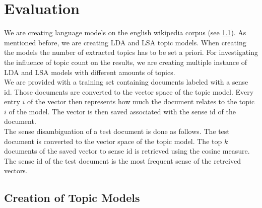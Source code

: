 \section{Evaluation}



We are creating language models on the english wikipedia corpus (see \ref{creation}). As mentioned before, we are creating LDA and LSA topic models. When creating the models the number of extracted topics has to be set a priori. For investigating the influence of topic count on the results, we are creating multiple instance of LDA and LSA models with different amounts of topics.\\
We are provided with a training set containing documents labeled with a sense id. Those documents are converted to the vector space of the topic model. Every entry $i$ of the vector then represents how much the document relates to the topic $i$ of the model. The vector is then saved associated with the sense id of the document.\\
The sense disambiguation of a test document is done as follows. The test document is converted to the vector space of the topic model. The top $k$ documents of the saved vector to sense id is retrieved using the cosine measure. The sense id of the test document is the most frequent sense of the retreived vectors.



\subsection{Creation of Topic Models}
\label{creation}


